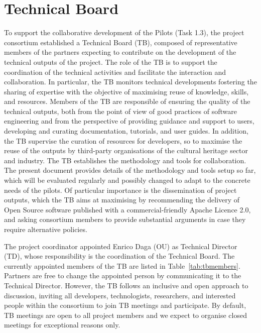 \chapter{Technical Board}\label{ch:technical-board}
To support the collaborative development of the Pilots (Task 1.3), the project consortium established a Technical Board (TB), composed of representative members of the partners expecting to contribute on the development of the technical outputs of the project.
The role of the TB is to support the coordination of the technical activities and facilitate the interaction and collaboration.
In particular, the TB monitors technical developments fostering the sharing of expertise with the objective of maximising reuse of knowledge, skills, and resources.
Members of the TB are responsible of ensuring the quality of the technical outputs, both from the point of view of good practices of software engineering and from the perspective of providing guidance and support to users, developing and curating documentation, tutorials, and user guides.
In addition, the TB supervise the curation of resources for developers, so to maximise the reuse of the outputs by third-party organisations of the cultural heritage sector and industry.
The TB establishes the methodology and tools for collaboration.
The present document provides details of the methodology and tools setup so far, which will be evaluated regularly and possibly changed to adapt to the concrete needs of the pilots.
Of particular importance is the dissemination of project outputs, which the TB aims at maximising by recommending the delivery of Open Source software published with a commercial-friendly Apache Licence 2.0, and asking consortium members to provide substantial arguments in case they require alternative policies.

The project coordinator appointed Enrico Daga (OU) as Technical Director (TD), whose responsibility is the coordination of the Technical Board. 
The currently appointed members of the TB are listed in Table~\ref{tab:tbmembers}.
Partners are free to change the appointed person by communicating it to the Technical Director.
However, the TB follows an inclusive and open approach to discussion, inviting all developers, technologists, researchers, and interested people within the consortium to join TB meetings and participate. By default, TB meetings are open to all project members and we expect to organise closed meetings for exceptional reasons only.

